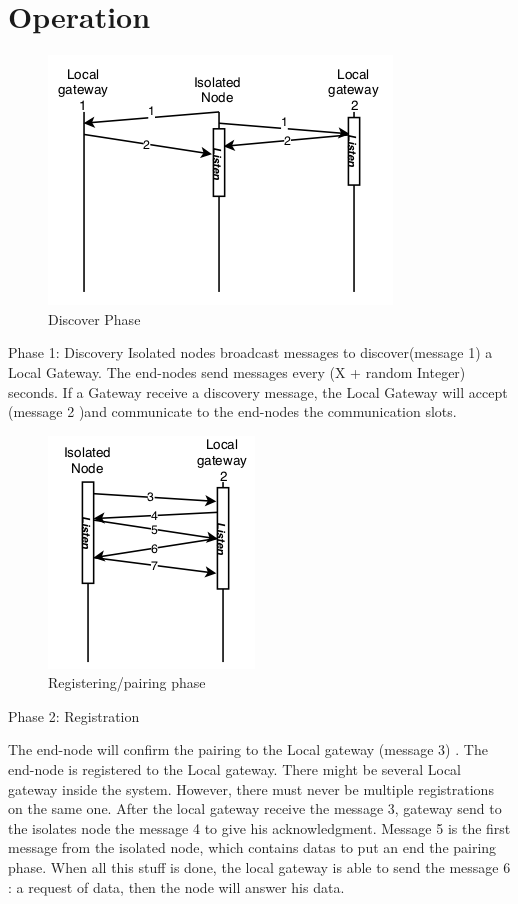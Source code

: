 \documentclass[conference]{IEEEtran}
\begin{document}
\section{Operation}
\begin{figure}[htbp]
\centerline{\includegraphics{discover.png}}
\caption{Discover Phase}
\label{fig1}
\end{figure}
Phase 1: Discovery 
Isolated nodes broadcast messages to discover(message 1) a Local Gateway. The end-nodes send messages every (X + random Integer) seconds. If a  Gateway receive a discovery message, the Local Gateway will accept (message 2 )and communicate to the end-nodes the communication slots.



\begin{figure}[htbp]
\centerline{\includegraphics{register.png}}
\caption{Registering/pairing phase}
\label{fig2}
\end{figure}
Phase 2: Registration
 
The end-node will confirm the pairing to the Local gateway (message 3) . The end-node is registered to the Local gateway. 
There might be several Local gateway inside the system. However, there must never be multiple registrations on the same one.
After the local gateway receive the message 3, gateway send to the isolates node the message 4 to give his acknowledgment.
Message 5 is the first message from the isolated node, which contains datas to put an end the pairing phase. When all this stuff is done, the local gateway is able to send the message 6 : a request of data, then the node will answer his data.
 
\end{document}
